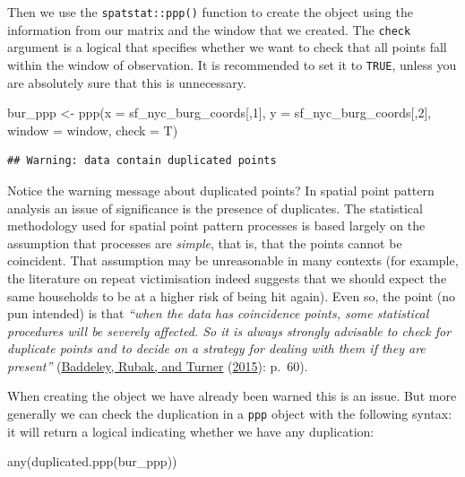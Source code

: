 \documentclass[
  krantz2]{krantz}
\makeatletter
\newenvironment{Shaded}{\begin{snugshade}}{\end{snugshade}}
\newcommand{\AttributeTok}[1]{\textcolor[rgb]{0.61,0.61,0.61}{#1}}
\newcommand{\DecValTok}[1]{\textcolor[rgb]{0.06,0.06,0.06}{#1}}
\newcommand{\FunctionTok}[1]{\textcolor[rgb]{0,0,0}{#1}}
\newcommand{\NormalTok}[1]{#1}
\newcommand{\OtherTok}[1]{\textcolor[rgb]{0.37,0.37,0.37}{#1}}
\newenvironment{kframe}{%
\medskip{}
\setlength{\fboxsep}{.8em}
 \def\at@end@of@kframe{}%
 \ifinner\ifhmode%
  \def\at@end@of@kframe{\end{minipage}}%
  \begin{minipage}{\columnwidth}%
 \fi\fi%
 \def\FrameCommand##1{\hskip\@totalleftmargin \hskip-\fboxsep
 \colorbox{shadecolor}{##1}\hskip-\fboxsep
     \hskip-\linewidth \hskip-\@totalleftmargin \hskip\columnwidth}%
 \MakeFramed {\advance\hsize-\width
   \@totalleftmargin\z@ \linewidth\hsize
   \@setminipage}}%
 {\par\unskip\endMakeFramed%
 \at@end@of@kframe}
\renewenvironment{Shaded}{\begin{kframe}}{\end{kframe}}
\makeatother
\begin{document}
Then we use the \texttt{spatstat::ppp()} function to create the object using the information from our matrix and the window that we created. The \texttt{check} argument is a logical that specifies whether we want to check that all points fall within the window of observation. It is recommended to set it to \texttt{TRUE}, unless you are absolutely sure that this is unnecessary.

\begin{Shaded}
\begin{Highlighting}[]
\NormalTok{bur\_ppp }\OtherTok{\textless{}{-}} \FunctionTok{ppp}\NormalTok{(}\AttributeTok{x =}\NormalTok{ sf\_nyc\_burg\_coords[,}\DecValTok{1}\NormalTok{], }\AttributeTok{y =}\NormalTok{ sf\_nyc\_burg\_coords[,}\DecValTok{2}\NormalTok{],}
                   \AttributeTok{window =}\NormalTok{ window, }\AttributeTok{check =}\NormalTok{ T)}
\end{Highlighting}
\end{Shaded}

\begin{verbatim}
## Warning: data contain duplicated points
\end{verbatim}

Notice the warning message about duplicated points? In spatial point pattern analysis an issue of significance is the presence of duplicates. The statistical methodology used for spatial point pattern processes is based largely on the assumption that processes are \emph{simple}, that is, that the points cannot be coincident. That assumption may be unreasonable in many contexts (for example, the literature on repeat victimisation indeed suggests that we should expect the same households to be at a higher risk of being hit again). Even so, the point (no pun intended) is that \emph{``when the data has coincidence points, some statistical procedures will be severely affected. So it is always strongly advisable to check for duplicate points and to decide on a strategy for dealing with them if they are present''} (\protect\hyperlink{ref-Baddeley_2016}{Baddeley, Rubak, and Turner} (\protect\hyperlink{ref-Baddeley_2016}{2015}): p.~60).

When creating the object we have already been warned this is an issue. But more generally we can check the duplication in a \texttt{ppp} object with the following syntax: it will return a logical indicating whether we have any duplication:

\begin{Shaded}
\begin{Highlighting}[]
\FunctionTok{any}\NormalTok{(}\FunctionTok{duplicated.ppp}\NormalTok{(bur\_ppp))}
\end{Highlighting}
\end{Shaded}
\end{document}
